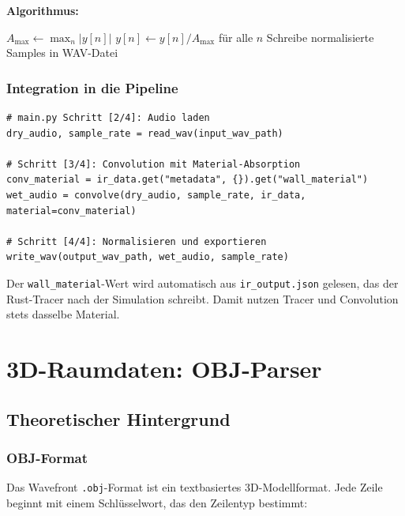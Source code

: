 \documentclass[11pt,a4paper,twoside]{report}
\begin{document}
\textbf{Algorithmus:}

\begin{algorithm}
    \caption{Normalisierter WAV-Export}
    \begin{algorithmic}
        \STATE $A_{\max} \gets \max_n |y[n]|$
            \STATE $y[n] \gets y[n] / A_{\max}$ f\"ur alle $n$
        \ENDIF
        \STATE Schreibe normalisierte Samples in WAV-Datei
    \end{algorithmic}
\end{algorithm}

\subsection{Integration in die Pipeline}

\begin{lstlisting}
# main.py Schritt [2/4]: Audio laden
dry_audio, sample_rate = read_wav(input_wav_path)

# Schritt [3/4]: Convolution mit Material-Absorption
conv_material = ir_data.get("metadata", {}).get("wall_material")
wet_audio = convolve(dry_audio, sample_rate, ir_data, material=conv_material)

# Schritt [4/4]: Normalisieren und exportieren
write_wav(output_wav_path, wet_audio, sample_rate)
\end{lstlisting}

Der \texttt{wall\_material}-Wert wird automatisch aus \texttt{ir\_output.json} gelesen, das der Rust-Tracer nach der Simulation schreibt. Damit nutzen Tracer und Convolution stets dasselbe Material.

\chapter{3D-Raumdaten: OBJ-Parser}

\section{Theoretischer Hintergrund}

\subsection{OBJ-Format}

Das Wavefront \texttt{.obj}-Format ist ein textbasiertes 3D-Modellformat.
Jede Zeile beginnt mit einem Schl\"usselwort, das den Zeilentyp bestimmt:
\end{document}
